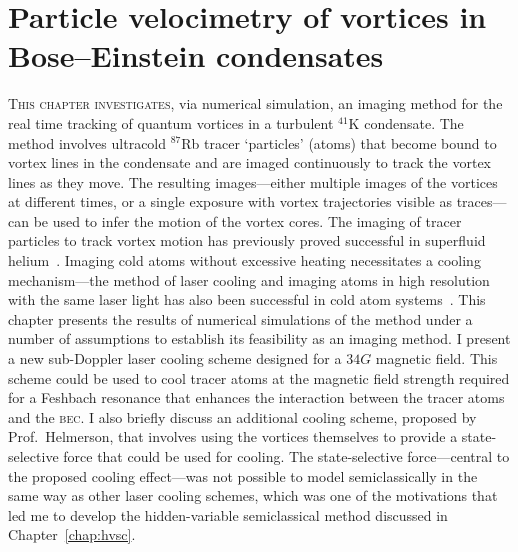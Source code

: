 
\chapter{Particle velocimetry of vortices in Bose–Einstein condensates}\label{chap:velocimetry}

\lettrine[lines=3]{T}{his chapter investigates}, via numerical simulation, an imaging method for the real time tracking of quantum vortices in a turbulent $^{41}$K condensate. The method involves ultracold $^{87}$Rb tracer `particles' (atoms) that become bound to vortex lines in the condensate and are imaged continuously to track the vortex lines as they move. The resulting images---either multiple images of the vortices at different times, or a single exposure with vortex trajectories visible as traces---can be used to infer the motion of the vortex cores. The imaging of tracer particles to track vortex motion has previously proved successful in superfluid helium~\cite{bewley_generation_2009, bewley_superfluid_2006, packard_vortex_1982}. Imaging cold atoms without excessive heating necessitates a cooling mechanism---the method of laser cooling and imaging atoms in high resolution with the same laser light has also been successful in cold atom systems~\cite{bakr_quantum_2009}. This chapter presents the results of numerical simulations of the method under a number of assumptions to establish its feasibility as an imaging method. I present a new sub-Doppler laser cooling scheme designed for a $34\unit{G}$ magnetic field. This scheme could be used to cool tracer atoms at the magnetic field strength required for a Feshbach resonance that enhances the interaction between the tracer atoms and the \textsc{bec}. I also briefly discuss an additional cooling scheme, proposed by Prof.~Helmerson, that involves using the vortices themselves to provide a state-selective force that could be used for cooling. The state-selective force---central to the proposed cooling effect---was not possible to model semiclassically in the same way as other laser cooling schemes, which was one of the motivations that led me to develop the hidden-variable semiclassical method discussed in Chapter~\ref{chap:hvsc}.

